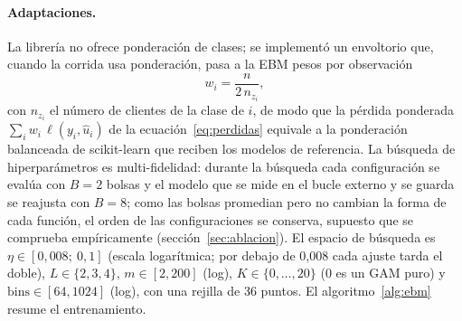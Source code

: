 \paragraph{Adaptaciones.}
La librería no ofrece ponderación de clases; se implementó un envoltorio que, cuando la corrida usa
ponderación, pasa a la EBM pesos por observación
\begin{equation}
  w_i = \frac{n}{2\, n_{z_i}},
  \label{eq:pesos}
\end{equation}
con $n_{z_i}$ el número de clientes de la clase de $i$, de modo que la pérdida ponderada
$\sum_i w_i\, \ell(y_i, \hat{u}_i)$ de la ecuación~\eqref{eq:perdidas} equivale a la ponderación balanceada de scikit-learn que reciben los modelos de
referencia. La búsqueda de hiperparámetros es multi-fidelidad: durante la búsqueda cada configuración se
evalúa con $B = 2$ bolsas y el modelo que se mide en el bucle externo y se guarda se reajusta con $B = 8$;
como las bolsas promedian pero no cambian la forma de cada función, el orden de las configuraciones se
conserva, supuesto que se comprueba empíricamente (sección~\ref{sec:ablacion}). El espacio de búsqueda es
$\eta \in [0{,}008;\ 0{,}1]$ (escala logarítmica; por debajo de 0,008 cada ajuste tarda el doble),
$L \in \{2, 3, 4\}$, $m \in [2, 200]$ (log), $K \in \{0, \dots, 20\}$ (0 es un GAM puro) y
$\mathrm{bins} \in [64, 1024]$ (log), con una rejilla de 36 puntos. El algoritmo~\ref{alg:ebm} resume el
entrenamiento.

